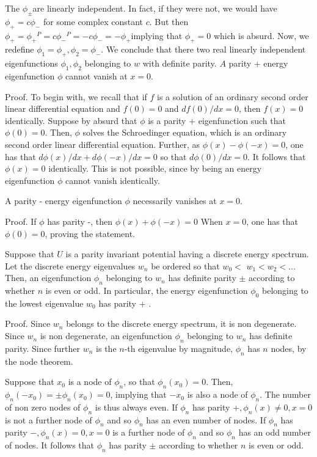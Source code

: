 \documentclass{article}
\begin{document}
The $\phi_{ \pm}$are linearly independent. In fact, if they were not, we would have $\phi_{+}=c \phi_{-}$ for some complex constant $c$. But then $\phi_{+}=\phi_{+}{ }^{P}=c \phi_{-}{ }^{P}=-c \phi_{-}=-\phi_{+}$implying that $\phi_{+}=0$ which is absurd. Now, we redefine $\phi_{1}=\phi_{+}, \phi_{2}=\phi_{-}$. We conclude that there two real linearly independent eigenfunctions $\phi_{1}, \phi_{2}$ belonging to $w$ with definite parity.
$A$ parity + energy eigenfunction $\phi$ cannot vanish at $x=0$.

Proof. To begin with, we recall that if $f$ is a solution of an ordinary second order linear differential equation and $f(0)=0$ and $d f(0) / d x=0$, then $f(x)=0$ identically. Suppose by absurd that $\phi$ is a parity + eigenfunction such that $\phi(0)=0$. Then, $\phi$ solves the Schroedinger equation, which is an ordinary second order linear differential equation. Further, as $\phi(x)-\phi(-x)=0$, one has that $d \phi(x) / d x+d \phi(-x) / d x=0$ so
that $d \phi(0) / d x=0$. It follows that $\phi(x)=0$ identically. This is not possible, since by being an energy eigenfunction $\phi$ cannot vanish identically.

A parity - energy eigenfunction $\phi$ necessarily vanishes at $x=0$.

Proof. If $\phi$ has parity -, then $\phi(x)+\phi(-x)=0$ When $x=0$, one has that $\phi(0)=0$, proving the statement.

Suppose that $U$ is a parity invariant potential having a discrete energy spectrum. Let the discrete energy eigenvalues $w_{n}$ be ordered so that $w_{0}<$ $w_{1}<w_{2}<\ldots$ Then, an eigenfunction $\phi_{n}$ belonging to $w_{n}$ has definite parity $\pm$ according to whether $n$ is even or odd. In particular, the energy eigenfunction $\phi_{0}$ belonging to the lowest eigenvalue $w_{0}$ has parity + .

Proof. Since $w_{n}$ belongs to the discrete energy spectrum, it is non degenerate. Since $w_{n}$ is non degenerate, an eigenfunction $\phi_{n}$ belonging to $w_{n}$ has definite parity. Since further $w_{n}$ is the $n$-th eigenvalue by magnitude, $\phi_{n}$ has $n$ nodes, by the node theorem.

Suppose that $x_{0}$ is a node of $\phi_{n}$, so that $\phi_{n}\left(x_{0}\right)=0$. Then, $\phi_{n}\left(-x_{0}\right)= \pm \phi_{n}\left(x_{0}\right)=0$, implying that $-x_{0}$ is also a node of $\phi_{n}$. The number of non zero nodes of $\phi_{n}$ is thus always even. If $\phi_{n}$ has parity $+, \phi_{n}(x) \neq 0, x=0$ is not a further node of $\phi_{n}$ and so $\phi_{n}$ has an even number of nodes. If $\phi_{n}$ has parity $-, \phi_{n}(x)=0, x=0$ is a further node of $\phi_{n}$ and so $\phi_{n}$ has an odd number of nodes. It follows that $\phi_{n}$ has parity $\pm$ according to whether $n$ is even or odd.
\end{document}
